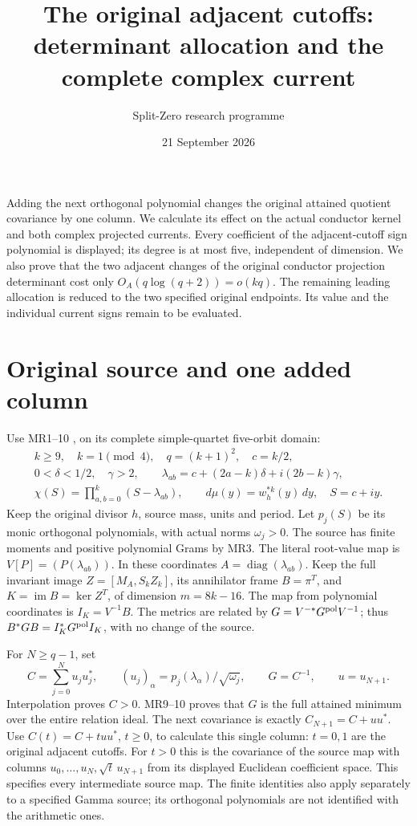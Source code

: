 \documentclass[11pt]{article}
\title{The original adjacent cutoffs:\\determinant allocation and the complete complex current}
\author{Split-Zero research programme}\date{21 September 2026}
\begin{document}
\maketitle
Adding the next orthogonal polynomial changes the original attained
quotient covariance by one column. We calculate its effect on the actual
conductor kernel and both complex projected currents. Every coefficient
of the adjacent-cutoff sign polynomial is displayed; its degree is at
most five, independent of dimension. We also prove that the two adjacent
changes of the original conductor projection determinant cost only
\(O_A(q\log(q+2))=o(kq)\). The remaining leading allocation is reduced
to the two specified original endpoints. Its value and the individual
current signs remain to be evaluated.

\section{Original source and one added column}
Use MR1--10 \cite{MR}, on its complete simple-quartet five-orbit domain:
\begin{equation}\tag{ACC1}
\begin{gathered}
k\ge9,\quad k=1\pmod4,\quad q=(k+1)^2,\quad c=k/2,\\
0<\delta<1/2,\quad\gamma>2,\qquad
\lambda_{ab}=c+(2a-k)\delta+i(2b-k)\gamma,\\
\chi(S)=\prod_{a,b=0}^k(S-\lambda_{ab}),\qquad
d\mu(y)=w_h^{*k}(y)\,dy,\quad S=c+iy .
\end{gathered}
\end{equation}
Keep the original divisor \(h\), source mass, units and period.
Let \(p_j(S)\) be its monic orthogonal polynomials, with actual norms
\(\omega_j>0\). The source has finite moments and positive polynomial
Grams by MR3. The literal root-value map is \(V[P]=(P(\lambda_{ab}))\).
In these coordinates \(A=\operatorname{diag}(\lambda_{ab})\).
Keep the full invariant image \(Z=[M_A,S_kZ_k]\), its annihilator frame
\(B=\pi^T\), and \(K=\operatorname{im}B=\ker Z^T\), of dimension
\(m=8k-16\). The map from polynomial coordinates is \(I_K=V^{-1}B\).
The metrics are related by \(G=V^{-*}G^{\rm pol}V^{-1}\);
thus \(B^*GB=I_K^*G^{\rm pol}I_K\), with no change of the source.

For \(N\ge q-1\), set
\begin{equation}\tag{ACC2}
C=\sum_{j=0}^N u_ju_j^*,\qquad
(u_j)_\alpha=p_j(\lambda_\alpha)/\sqrt{\omega_j},\qquad
G=C^{-1},\qquad u=u_{N+1}.
\end{equation}
Interpolation proves \(C>0\). MR9--10 proves that \(G\) is the full
attained minimum over the entire relation ideal. The next covariance
is exactly \(C_{N+1}=C+uu^*\).
Use \(C(t)=C+tuu^*\), \(t\ge0\), to calculate this single column:
\(t=0,1\) are the original adjacent cutoffs. For \(t>0\) this is the
covariance of the source map with columns
\(u_0,\ldots,u_N,\sqrt t\,u_{N+1}\) from its displayed Euclidean
coefficient space. This specifies every intermediate source map.
The finite identities also apply separately to a specified Gamma source;
its orthogonal polynomials are not identified with the arithmetic ones.
\end{document}
